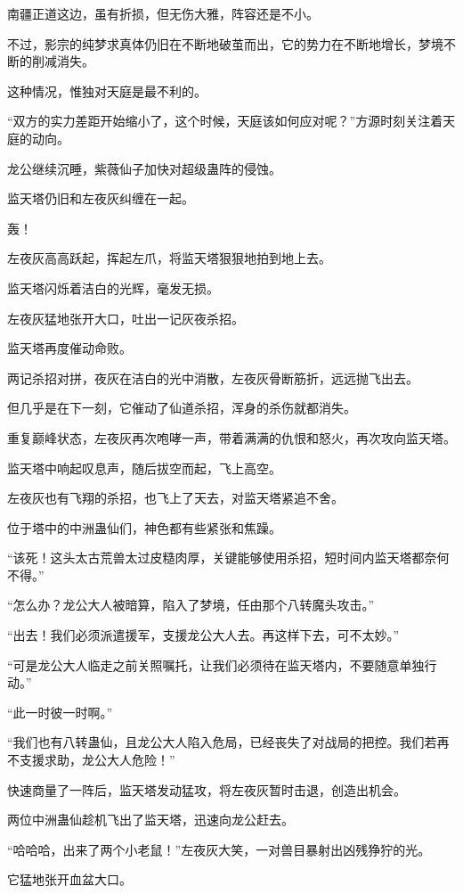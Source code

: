 \begin{this_body}
南疆正道这边，虽有折损，但无伤大雅，阵容还是不小。

不过，影宗的纯梦求真体仍旧在不断地破茧而出，它的势力在不断地增长，梦境不断的削减消失。

这种情况，惟独对天庭是最不利的。

“双方的实力差距开始缩小了，这个时候，天庭该如何应对呢？”方源时刻关注着天庭的动向。

龙公继续沉睡，紫薇仙子加快对超级蛊阵的侵蚀。

监天塔仍旧和左夜灰纠缠在一起。

轰！

左夜灰高高跃起，挥起左爪，将监天塔狠狠地拍到地上去。

监天塔闪烁着洁白的光辉，毫发无损。

左夜灰猛地张开大口，吐出一记灰夜杀招。

监天塔再度催动命败。

两记杀招对拼，夜灰在洁白的光中消散，左夜灰骨断筋折，远远抛飞出去。

但几乎是在下一刻，它催动了仙道杀招，浑身的杀伤就都消失。

重复巅峰状态，左夜灰再次咆哮一声，带着满满的仇恨和怒火，再次攻向监天塔。

监天塔中响起叹息声，随后拔空而起，飞上高空。

左夜灰也有飞翔的杀招，也飞上了天去，对监天塔紧追不舍。

位于塔中的中洲蛊仙们，神色都有些紧张和焦躁。

“该死！这头太古荒兽太过皮糙肉厚，关键能够使用杀招，短时间内监天塔都奈何不得。”

“怎么办？龙公大人被暗算，陷入了梦境，任由那个八转魔头攻击。”

“出去！我们必须派遣援军，支援龙公大人去。再这样下去，可不太妙。”

“可是龙公大人临走之前关照嘱托，让我们必须待在监天塔内，不要随意单独行动。”

“此一时彼一时啊。”

“我们也有八转蛊仙，且龙公大人陷入危局，已经丧失了对战局的把控。我们若再不支援求助，龙公大人危险！”

快速商量了一阵后，监天塔发动猛攻，将左夜灰暂时击退，创造出机会。

两位中洲蛊仙趁机飞出了监天塔，迅速向龙公赶去。

“哈哈哈，出来了两个小老鼠！”左夜灰大笑，一对兽目暴射出凶残狰狞的光。

它猛地张开血盆大口。


\end{this_body}

